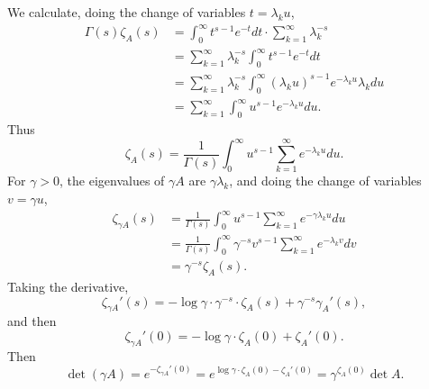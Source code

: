 \documentclass{article}
\theoremstyle{definition}
\begin{document}
We calculate, doing the change of variables $t=\lambda_k u$,
\begin{align*}
\Gamma(s) \zeta_A(s)&=\int_0^\infty t^{s-1} e^{-t} dt \cdot \sum_{k=1}^\infty \lambda_k^{-s}\\
&=\sum_{k=1}^\infty  \lambda_k^{-s}  \int_0^\infty t^{s-1} e^{-t}dt\\
&=\sum_{k=1}^\infty \lambda_k^{-s} \int_0^\infty (\lambda_k u)^{s-1} e^{-\lambda_k u} \lambda_k du\\
&=\sum_{k=1}^\infty \int_0^\infty u^{s-1} e^{-\lambda_k u} du.
\end{align*}
Thus
\[
\zeta_A(s) = \frac{1}{\Gamma(s)} \int_0^\infty u^{s-1} \sum_{k=1}^\infty e^{-\lambda_k u} du.
\]
For $\gamma>0$, the eigenvalues of $\gamma A$ are $\gamma \lambda_k$, and doing the change of variables
$v=\gamma u$,
\begin{align*}
\zeta_{\gamma A}(s) &=\frac{1}{\Gamma(s)} \int_0^\infty u^{s-1} \sum_{k=1}^\infty e^{-\gamma \lambda_k u} du\\
&= \frac{1}{\Gamma(s)} \int_0^\infty \gamma^{-s} v^{s-1} \sum_{k=1}^\infty e^{-\lambda_k v} dv\\
&=\gamma^{-s} \zeta_A(s).
\end{align*}
Taking the derivative,
\[
\zeta_{\gamma A}'(s) = -\log \gamma \cdot \gamma^{-s} \cdot \zeta_A(s) + \gamma^{-s} \gamma_A'(s),
\]
and then
\[
\zeta_{\gamma A}'(0) = -\log \gamma \cdot \zeta_A(0) + \zeta_A'(0). 
\]
Then
\[
\det (\gamma A) = e^{-\zeta_{\gamma A}'(0)} = e^{\log \gamma \cdot \zeta_A(0) - \zeta_A'(0)}
=\gamma^{\zeta_A(0)} \det A.
\]
\end{document}
